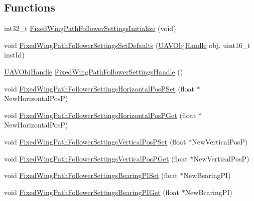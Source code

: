 \subsection*{\-Functions}
\begin{DoxyCompactItemize}
\item 
int32\-\_\-t \hyperlink{group___fixed_wing_path_follower_settings_ga112eaf403ca09c7915b4541ba3a41f5e}{\-Fixed\-Wing\-Path\-Follower\-Settings\-Initialize} (void)
\item 
void \hyperlink{group___fixed_wing_path_follower_settings_gae47755861f284d724f6b21e31cd11fb0}{\-Fixed\-Wing\-Path\-Follower\-Settings\-Set\-Defaults} (\hyperlink{targets_2_u_a_v_objects_2inc_2uavobjectmanager_8h_a279053e22be53ce9f895043aaeb91e3b}{\-U\-A\-V\-Obj\-Handle} obj, uint16\-\_\-t inst\-Id)
\item 
\hyperlink{targets_2_u_a_v_objects_2inc_2uavobjectmanager_8h_a279053e22be53ce9f895043aaeb91e3b}{\-U\-A\-V\-Obj\-Handle} \hyperlink{group___fixed_wing_path_follower_settings_gac5f7052e08f8d0908eaa6e991689e104}{\-Fixed\-Wing\-Path\-Follower\-Settings\-Handle} ()
\item 
void \hyperlink{group___fixed_wing_path_follower_settings_ga3a61717a081a0b75bb5d652ec2b6b633}{\-Fixed\-Wing\-Path\-Follower\-Settings\-Horizontal\-Pos\-P\-Set} (float $\ast$\-New\-Horizontal\-Pos\-P)
\item 
void \hyperlink{group___fixed_wing_path_follower_settings_ga456dc901754b748050987dd3ee62fe06}{\-Fixed\-Wing\-Path\-Follower\-Settings\-Horizontal\-Pos\-P\-Get} (float $\ast$\-New\-Horizontal\-Pos\-P)
\item 
void \hyperlink{group___fixed_wing_path_follower_settings_ga9c24effaf27eda1b17dcf4e3d2911d4d}{\-Fixed\-Wing\-Path\-Follower\-Settings\-Vertical\-Pos\-P\-Set} (float $\ast$\-New\-Vertical\-Pos\-P)
\item 
void \hyperlink{group___fixed_wing_path_follower_settings_gaf5b86e8c0a48f9ef62f81f41073aa174}{\-Fixed\-Wing\-Path\-Follower\-Settings\-Vertical\-Pos\-P\-Get} (float $\ast$\-New\-Vertical\-Pos\-P)
\item 
void \hyperlink{group___fixed_wing_path_follower_settings_ga2492a3b81f42d05c0f5fd666caf48d35}{\-Fixed\-Wing\-Path\-Follower\-Settings\-Bearing\-P\-I\-Set} (float $\ast$\-New\-Bearing\-P\-I)
\item 
void \hyperlink{group___fixed_wing_path_follower_settings_gaff82800bdb11465d8337c02f6771f1d6}{\-Fixed\-Wing\-Path\-Follower\-Settings\-Bearing\-P\-I\-Get} (float $\ast$\-New\-Bearing\-P\-I)
\item 

\end{DoxyCompactItemize}
